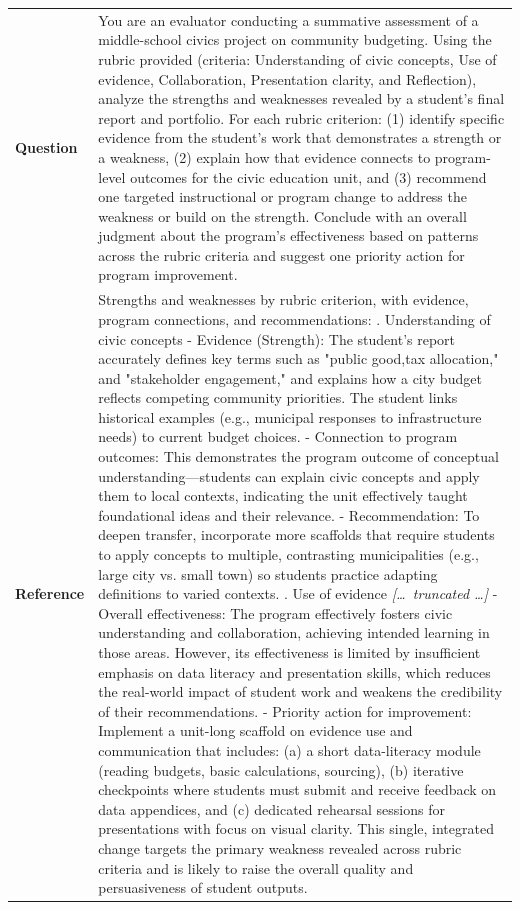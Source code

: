 \begin{longtable}{@{}l p{12.5cm}@{}}
  \textbf{Question} & You are an evaluator conducting a summative assessment of a middle-school civics project on community budgeting. Using the rubric provided (criteria: Understanding of civic concepts, Use of evidence, Collaboration, Presentation clarity, and Reflection), analyze the strengths and weaknesses revealed by a student's final report and portfolio. For each rubric criterion: (1) identify specific evidence from the student's work that demonstrates a strength or a weakness, (2) explain how that evidence connects to program-level outcomes for the civic education unit, and (3) recommend one targeted instructional or program change to address the weakness or build on the strength. Conclude with an overall judgment about the program's effectiveness based on patterns across the rubric criteria and suggest one priority action for program improvement. \\
  \textbf{Reference} & Strengths and weaknesses by rubric criterion, with evidence, program connections, and recommendations: \newline 1. Understanding of civic concepts \newline - Evidence (Strength): The student's report accurately defines key terms such as "public good,tax allocation," and "stakeholder engagement," and explains how a city budget reflects competing community priorities. The student links historical examples (e.g., municipal responses to infrastructure needs) to current budget choices. \newline - Connection to program outcomes: This demonstrates the program outcome of conceptual understanding---students can explain civic concepts and apply them to local contexts, indicating the unit effectively taught foundational ideas and their relevance. \newline - Recommendation: To deepen transfer, incorporate more scaffolds that require students to apply concepts to multiple, contrasting municipalities (e.g., large city vs. small town) so students practice adapting definitions to varied contexts. \newline 2. Use of evidence \newline \textit{[\ldots\ truncated \ldots]} \newline - Overall effectiveness: The program effectively fosters civic understanding and collaboration, achieving intended learning in those areas. However, its effectiveness is limited by insufficient emphasis on data literacy and presentation skills, which reduces the real-world impact of student work and weakens the credibility of their recommendations. \newline - Priority action for improvement: Implement a unit-long scaffold on evidence use and communication that includes: (a) a short data-literacy module (reading budgets, basic calculations, sourcing), (b) iterative checkpoints where students must submit and receive feedback on data appendices, and (c) dedicated rehearsal sessions for presentations with focus on visual clarity. This single, integrated change targets the primary weakness revealed across rubric criteria and is likely to raise the overall quality and persuasiveness of student outputs. \\

\end{longtable}
